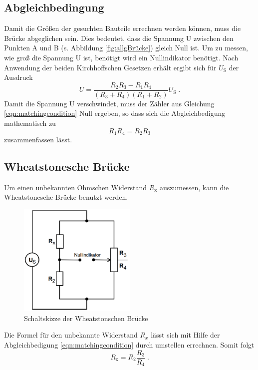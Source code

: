 \subsection{Abgleichbedingung}
Damit die Größen der gesuchten Bauteile errechnen werden können, muss die Brücke abgeglichen sein. Dies bedeutet, dass die Spannung U zwischen den Punkten A und B (s. 
Abbildung \ref{fig:allgBrücke}) gleich Null ist. Um zu messen, wie groß die Spannung U ist, benötigt wird ein Nullindikator benötigt.
Nach Anwendung der beiden Kirchhoffschen Gesetzen erhält ergibt sich für $U_\text{S}$ der Ausdruck  
\begin{equation}
    U = \frac{R_2 R_3 - R_1 R_4}{\left( R_3 + R_4 \right) \left( R_1 + R_2\right)} U_\text{S} \; \text{.} \label{eqn:matchingcondition}
\end{equation}
Damit die Spannung U verschwindet, muss der Zähler aus Gleichung \eqref{eqn:matchingcondition} Null ergeben, so dass sich die Abgleichbedigung mathematisch zu
\begin{equation}
    R_1 R_4 = R_2 R_3 \label{fig:matchingcondition}
\end{equation}
zusammenfassen lässt. 
\subsection{Wheatstonesche Brücke}
Um einen unbekannten Ohmschen Widerstand $R_\text{x}$ auszumessen, kann die Wheatstonesche Brücke benutzt werden. 
\begin{figure}
    \centering
    \caption{Schaltskizze der Wheatstonschen Brücke}
    \label{fig:Wheatstone}
    \includegraphics[width = 0.5\textwidth]{bridges/wheat.png}
\end{figure}
Die Formel für den unbekannte Widerstand $R_x$ lässt sich mit Hilfe der Abgleichbedigung \eqref{eqn:matchingcondition} durch umstellen errechnen. Somit folgt 
\begin{equation}
    R_\text{x} = R_2 \frac{R_3}{R_4} \; \text{.} \label{eqn:wheat}
\end{equation}
